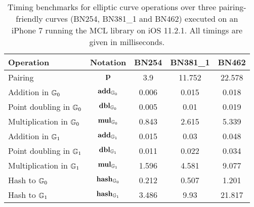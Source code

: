 
	

\begin{table}[H]
	\begin{center}
		\begin{tabular}{l|c||c|c|c}
		Operation            		 & Notation 				     & BN254 & BN381\_1  & BN462  \\
		\hline
		Pairing           			 & $\mathbf{p}$ 				 &3.9   & 11.752 & 22.578 \\
		Addition in $\mathbb{G}_0$ 		 & $\mathbf{add}_{\mathbb{G}_0}$   &0.006 & 0.015  & 0.018  \\
		Point doubling in $\mathbb{G}_0$   & $\mathbf{dbl}_{\mathbb{G}_0}$   &0.005 & 0.01   & 0.019  \\
		Multiplication in $\mathbb{G}_0$   & $\mathbf{mul}_{\mathbb{G}_0}$   &0.843 & 2.615  & 5.339  \\
		Addition in $\mathbb{G}_1$ 		     & $\mathbf{add}_{\mathbb{G}_1}$    &0.015 & 0.03   & 0.048  \\
		Point doubling in $\mathbb{G}_1$    & $\mathbf{dbl}_{\mathbb{G}_1}$    &0.011 & 0.022  & 0.034  \\
		Multiplication in $\mathbb{G}_1$    & $\mathbf{mul}_{\mathbb{G}_1}$    &1.596 & 4.581  & 9.077  \\
		Hash to $\mathbb{G}_0$             & $\mathbf{hash}_{\mathbb{G}_0}$  &0.212 & 0.507  & 1.201  \\
		Hash to $\mathbb{G}_1$              & $\mathbf{hash}_{\mathbb{G}_1}$   &3.486 & 9.93   & 21.817 \\
		\end{tabular}
		\caption{Timing benchmarks for elliptic curve operations over three pairing-friendly curves (BN254, BN381\_1 and BN462) executed on an iPhone 7 running the MCL library \cite{MCLLib} on iOS 11.2.1. All timings are given in milliseconds. \cite{MCLBench}}
		\label{table:benchmarks}
	\end{center}
\end{table}
